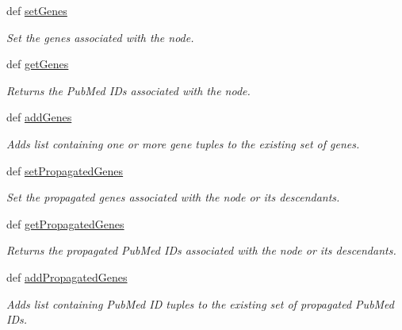 \begin{DoxyCompactItemize}
def \hyperlink{class_g_o_node_1_1_g_o_node_a45023d6ce53990bd76a0afb17851a2a3}{setGenes}
\begin{DoxyCompactList}\small\item\em Set the genes associated with the node. \item\end{DoxyCompactList}\item 
def \hyperlink{class_g_o_node_1_1_g_o_node_ac8e9c44abab1fecb6be48c79ed00b6da}{getGenes}
\begin{DoxyCompactList}\small\item\em Returns the PubMed IDs associated with the node. \item\end{DoxyCompactList}\item 
def \hyperlink{class_g_o_node_1_1_g_o_node_a435766664a659c441ff9c7a7fcae9605}{addGenes}
\begin{DoxyCompactList}\small\item\em Adds list containing one or more gene tuples to the existing set of genes. \item\end{DoxyCompactList}\item 
def \hyperlink{class_g_o_node_1_1_g_o_node_aec0d695435ba43ef55868c8ec0c786a1}{setPropagatedGenes}
\begin{DoxyCompactList}\small\item\em Set the propagated genes associated with the node or its descendants. \item\end{DoxyCompactList}\item 
def \hyperlink{class_g_o_node_1_1_g_o_node_add59505abccd2901703f705278d3d1df}{getPropagatedGenes}
\begin{DoxyCompactList}\small\item\em Returns the propagated PubMed IDs associated with the node or its descendants. \item\end{DoxyCompactList}\item 
def \hyperlink{class_g_o_node_1_1_g_o_node_af56efbcbab0996344aa9abd0db21e647}{addPropagatedGenes}
\begin{DoxyCompactList}\small\item\em Adds list containing PubMed ID tuples to the existing set of propagated PubMed IDs. \item\end{DoxyCompactList}\end{DoxyCompactItemize}
